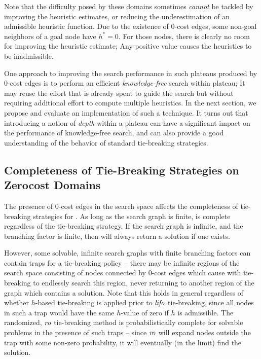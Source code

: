Note that the difficulty posed by these domains sometimes \emph{cannot}
be tackled by improving the heuristic estimates, or reducing the
underestimation of an admissible heuristic function.  Due to the
existence of 0-cost edges, some non-goal neighbors of a goal node 
have $h^*=0$. For those nodes,
there is clearly no room for improving the heuristic estimate; Any positive
value causes the heuristics to be inadmissible.

One approach to improving the search performance in such plateaus
produced by 0-cost edges is to perform an efficient
\emph{knowledge-free} search within plateau; It may reuse the effort
that is already spent to guide the search but without requiring 
additional effort to compute multiple heuristics.
In the next section, we propose and evaluate an implementation of
such a technique. It turns out that introducing a notion of \emph{depth} within a plateau can have
a significant impact on the performance of knowledge-free search, and can also 
provide a good  understanding of the behavior of standard tie-breaking strategies.

\subsection{Completeness of Tie-Breaking Strategies on Zerocost Domains}

The presence of 0-cost edges in the search space affects the completeness of tie-breaking strategies for \astar. 
As long as the search graph is finite, \astar is complete regardless of the tie-breaking strategy.
If the search graph is infinite, and the branching factor is finite, then 
\fifo will always return a solution if one exists.

However, some solvable, infinite search graphs with finite branching factors can contain traps for a \lifo tie-breaking policy -- there may be infinite regions of the search space consisting of nodes connected by 0-cost edges which cause \astar with \lifo tie-breaking to endlessly search this region, never returning to another region of the graph which contains a solution.
Note that this holds in general regardless of whether $h$-based tie-breaking is applied prior to ${\text{\textit{lifo}}}$ tie-breaking, since all nodes in such a trap would have the same $h$-value of zero if $h$ is admissible.
The randomized, ${\text{\textit{ro}}}$ tie-breaking method is probabilistically complete for solvable problems in the presence of such traps -- since ${\text{\textit{ro}}}$ will expand nodes outside the trap with some non-zero probability, it will eventually (in the limit) find the solution.

